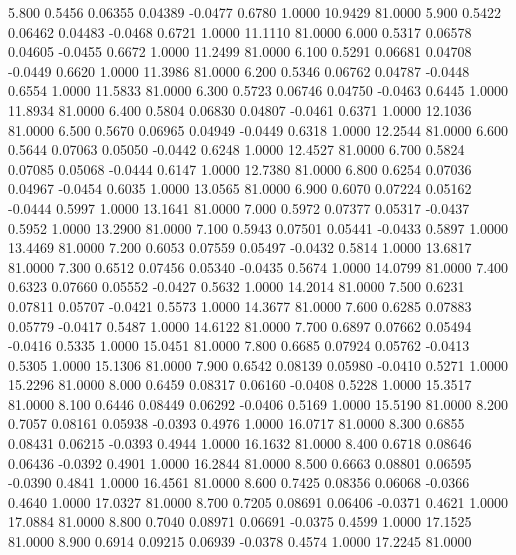    5.800   0.5456   0.06355   0.04389  -0.0477   0.6780   1.0000  10.9429  81.0000
   5.900   0.5422   0.06462   0.04483  -0.0468   0.6721   1.0000  11.1110  81.0000
   6.000   0.5317   0.06578   0.04605  -0.0455   0.6672   1.0000  11.2499  81.0000
   6.100   0.5291   0.06681   0.04708  -0.0449   0.6620   1.0000  11.3986  81.0000
   6.200   0.5346   0.06762   0.04787  -0.0448   0.6554   1.0000  11.5833  81.0000
   6.300   0.5723   0.06746   0.04750  -0.0463   0.6445   1.0000  11.8934  81.0000
   6.400   0.5804   0.06830   0.04807  -0.0461   0.6371   1.0000  12.1036  81.0000
   6.500   0.5670   0.06965   0.04949  -0.0449   0.6318   1.0000  12.2544  81.0000
   6.600   0.5644   0.07063   0.05050  -0.0442   0.6248   1.0000  12.4527  81.0000
   6.700   0.5824   0.07085   0.05068  -0.0444   0.6147   1.0000  12.7380  81.0000
   6.800   0.6254   0.07036   0.04967  -0.0454   0.6035   1.0000  13.0565  81.0000
   6.900   0.6070   0.07224   0.05162  -0.0444   0.5997   1.0000  13.1641  81.0000
   7.000   0.5972   0.07377   0.05317  -0.0437   0.5952   1.0000  13.2900  81.0000
   7.100   0.5943   0.07501   0.05441  -0.0433   0.5897   1.0000  13.4469  81.0000
   7.200   0.6053   0.07559   0.05497  -0.0432   0.5814   1.0000  13.6817  81.0000
   7.300   0.6512   0.07456   0.05340  -0.0435   0.5674   1.0000  14.0799  81.0000
   7.400   0.6323   0.07660   0.05552  -0.0427   0.5632   1.0000  14.2014  81.0000
   7.500   0.6231   0.07811   0.05707  -0.0421   0.5573   1.0000  14.3677  81.0000
   7.600   0.6285   0.07883   0.05779  -0.0417   0.5487   1.0000  14.6122  81.0000
   7.700   0.6897   0.07662   0.05494  -0.0416   0.5335   1.0000  15.0451  81.0000
   7.800   0.6685   0.07924   0.05762  -0.0413   0.5305   1.0000  15.1306  81.0000
   7.900   0.6542   0.08139   0.05980  -0.0410   0.5271   1.0000  15.2296  81.0000
   8.000   0.6459   0.08317   0.06160  -0.0408   0.5228   1.0000  15.3517  81.0000
   8.100   0.6446   0.08449   0.06292  -0.0406   0.5169   1.0000  15.5190  81.0000
   8.200   0.7057   0.08161   0.05938  -0.0393   0.4976   1.0000  16.0717  81.0000
   8.300   0.6855   0.08431   0.06215  -0.0393   0.4944   1.0000  16.1632  81.0000
   8.400   0.6718   0.08646   0.06436  -0.0392   0.4901   1.0000  16.2844  81.0000
   8.500   0.6663   0.08801   0.06595  -0.0390   0.4841   1.0000  16.4561  81.0000
   8.600   0.7425   0.08356   0.06068  -0.0366   0.4640   1.0000  17.0327  81.0000
   8.700   0.7205   0.08691   0.06406  -0.0371   0.4621   1.0000  17.0884  81.0000
   8.800   0.7040   0.08971   0.06691  -0.0375   0.4599   1.0000  17.1525  81.0000
   8.900   0.6914   0.09215   0.06939  -0.0378   0.4574   1.0000  17.2245  81.0000
